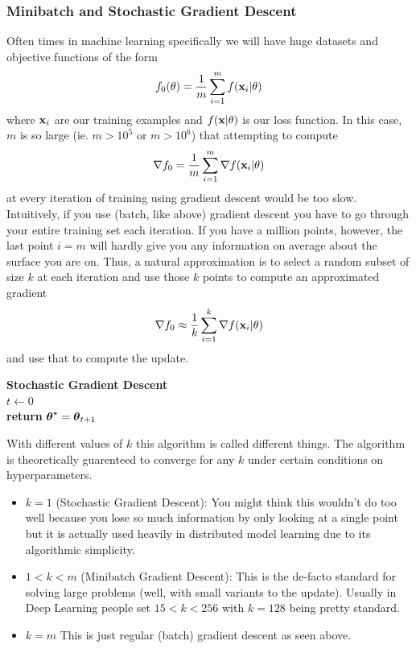 \documentclass{article}
\begin{document}
\subsubsection{Minibatch and Stochastic Gradient Descent}

Often times in machine learning specifically we will have huge datasets
and objective functions of the form
\[
    f_0(\theta) = \frac{1}{m}\sum_{i=1}^m f({\bf x}_i | \theta)
\]
where ${\bf x}_i$ are our training examples and $f({\bf x}|\theta)$ is our loss function.
In this case, $m$ is so large (ie. $m > 10^5$ or $m > 10^6$) that attempting to compute
\[
    \nabla f_0 = \frac{1}{m}\sum_{i=1}^m \nabla f({\bf x}_i | \theta)
\]
at every iteration of training using gradient descent would be too slow. Intuitively,
if you use (batch, like above) gradient descent you have to go through your
entire training set each iteration. If you have a million points, however,
the last point $i=m$ will hardly give you any information on average about the surface
you are on. Thus, a natural approximation is to select a random subset of size
$k$ at each iteration and use those $k$ points to compute an approximated gradient
\[
    \nabla f_0 \approx \frac{1}{k}\sum_{i=1}^k \nabla f({\bf x}_i | \theta)
\]
and use that to compute the update. 

\IncMargin{1em}
\begin{algorithm}
    \textbf{Stochastic Gradient Descent}\\
    $t \leftarrow 0$\\
    \textbf{return } $\hbox{\boldmath$\theta$}^\star = \hbox{\boldmath$\theta$}_{t+1}$
\end{algorithm}

With different values of $k$ this algorithm is called different things. The algorithm
is theoretically guarenteed to converge for any $k$ under certain conditions on hyperparameters.
\begin{itemize}
    \item $k=1$ (Stochastic Gradient Descent): You might think this wouldn't
        do too well because you lose so much information by only looking at a
        single point but it is actually used heavily in distributed model learning
        due to its algorithmic simplicity.
    \item $1 < k < m$ (Minibatch Gradient Descent): This is the de-facto standard
        for solving large problems (well, with small variants to the update). Usually in Deep
        Learning people set $15 < k < 256$ with $k=128$ being pretty standard.
    \item $k=m$ This is just regular (batch) gradient descent as seen above.
\end{itemize}
\end{document}
